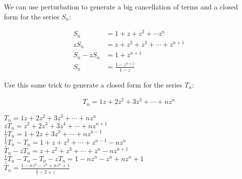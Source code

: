 \documentclass[solution,letterpaper]{cs20}
\begin{document}
  \begin{problem}
        We can use perturbation to generate a big cancellation of terms and a closed form for the series $S_n$:

        \begin{align*}
            S_n &= 1 + z + z^2 + \cdots z^n \\
            zS_n &= z + z^2 + z^3 + \cdots + z^{n+1} \\
            S_n - zS_n &= 1 + z^{n+1} \\
            S_n &= \frac{1 - z^{n+1}}{1 - z}
        \end{align*}

        Use this same trick to generate a closed form for the series $T_n$:

        \begin{align*}
            T_n = 1z + 2z^2 + 3z^3 + \cdots + nz^n
        \end{align*}

        \begin{solution}
            $ T_n = 1z + 2z^2 + 3z^3 + \cdots + nz^n$ \\
            $ zT_n = z^2 + 2z^3 + 3z^4 + \cdots + nz^{n+1}$ \\
            $ \frac{1}{z}T_n = 1 + 2z + 3z^2 + \cdots + nz^{n-1}$ \\
            $ \frac{1}{z}T_n - T_n = 1 + z + z^2 + \cdots + z^{n-1} - nz^n$ \\
            $T_n - zT_n = z + z^2 + z^3 + \cdots + z^n - nz^{n+1}$ \\
            $\frac{1}{z}T_n - T_n - T_n - zT_n = 1 - nz^n - z^n + nz^n+1$ \\
            $T_n = \frac{1 - nz^n - z^n + nz^n+1}{\frac{1}{z} - 2 + z}$ \\
        \end{solution}
    \end{problem}
    \newpage
\end{document}
